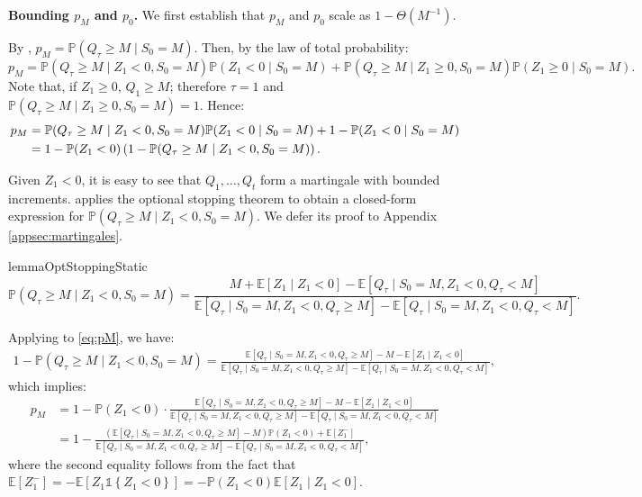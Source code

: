 \documentclass[mnsc,nonblindrev]{informs3}
\newcommand{\E}{\mathbb{E}}
\newcommand{\pr}{\mathbb{P}}
\renewcommand{\Pr}{\pr}
\newcommand{\ind}[1]{\mathds{1}\left\{#1\right\}}
\renewenvironment{proof}[1][Proof]{%
  \par\noindent{\itshape #1.} \ignorespaces
}{%
  \hfill\Halmos\par
}
\begin{document}
\begin{APPENDICES}
\begin{proof}
\medskip 
{\bf Bounding $p_M$ and $p_0$.} We first establish that $p_M$ and $p_0$ scale as $1-\Theta(M^{-1})$. 

By , $p_M = \mathbb{P}(Q_\tau \geq M \mid S_0 = M)$. Then, by the law of total probability:
\[
p_M = \Pr(Q_\tau \geq M \mid Z_1 < 0, S_0 = M) \Pr(Z_1 < 0 \mid S_0 = M) + \Pr(Q_\tau \geq M \mid Z_1 \geq 0, S_0 = M) \Pr(Z_1 \geq 0 \mid S_0 = M).
\]
Note that, if $Z_1 \geq 0$, $Q_1 \geq M$; therefore $\tau = 1$ and $\Pr(Q_\tau \geq M \mid Z_1 \geq 0, S_0 = M) = 1$. Hence:
\begin{align}\label{eq:pM}
p_M &= \Pr(Q_\tau \geq M \mid Z_1 < 0, S_0 = M) \Pr(Z_1 < 0 \mid S_0 = M) + 1 - \Pr(Z_1 < 0 \mid S_0 = M) \notag \\
&= 1-\Pr(Z_1 < 0)\left(1-\Pr(Q_\tau \geq M \mid Z_1 < 0, S_0 = M)\right).
\end{align}

Given $Z_1 < 0$, it is easy to see that $Q_1,\ldots,Q_t$ form a martingale with bounded increments.  applies the optional stopping theorem to obtain a closed-form expression for $\Pr(Q_\tau \geq M \mid Z_1 < 0, S_0 = M)$. We defer its proof to Appendix \ref{appsec:martingales}.

\begin{restatable}{lemma}{OptStoppingStatic}\label{lem:opt-stopping-static-1}
    \[\Pr\left(Q_\tau \geq M \mid Z_1 < 0, S_0 = M\right) = \frac{M+\E[Z_1 \mid Z_1 < 0]-\E[Q_\tau \mid S_0 = M, Z_1 < 0, Q_\tau < M]}{\E[Q_\tau \mid S_0 = M, Z_1 < 0, Q_\tau \geq M]-\E[Q_\tau \mid S_0 = M, Z_1 < 0, Q_\tau < M]}.\]
\end{restatable}

Applying  to \eqref{eq:pM}, we have:
\begin{align*}
1-\Pr\left(Q_\tau \geq M \mid Z_1 < 0, S_0 = M\right) = \frac{\E[Q_\tau \mid S_0 = M, Z_1 < 0, Q_\tau \geq M]-M-\E[Z_1 \mid Z_1 < 0]}{\E[Q_\tau \mid S_0 = M, Z_1 < 0, Q_\tau \geq M]-\E[Q_\tau \mid S_0 = M, Z_1 < 0, Q_\tau < M]},
\end{align*}
which implies:
\begin{align*}
p_M &= 1-\Pr(Z_1<0)\cdot \frac{\E[Q_\tau \mid S_0 = M, Z_1 < 0, Q_\tau \geq M]-M-\E[Z_1 \mid Z_1 < 0]}{\E[Q_\tau \mid S_0 = M, Z_1 < 0, Q_\tau \geq M]-\E[Q_\tau \mid S_0 = M, Z_1 < 0, Q_\tau < M]}\\
&= 1- \frac{\left(\E[Q_\tau \mid S_0 = M, Z_1 < 0, Q_\tau \geq M]-M\right)\Pr(Z_1<0)+\E[Z_1^-]}{\E[Q_\tau \mid S_0 = M, Z_1 < 0, Q_\tau \geq M]-\E[Q_\tau \mid S_0 = M, Z_1 < 0, Q_\tau < M]},
\end{align*}
where the second equality follows from the fact that $\E[Z_1^-] = -\E[Z_1\ind{Z_1 < 0}]=-\Pr(Z_1 < 0)\E[Z_1 \mid Z_1 < 0]$.


\end{proof}
\end{APPENDICES}
\end{document}
